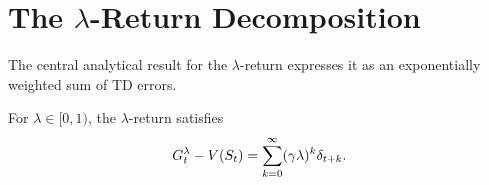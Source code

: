 \documentclass[11pt,a4paper]{article}
\begin{document}
\section{The $\lambda$-Return Decomposition}
\label{sec:lambda_decomp}

The central analytical result for the $\lambda$-return expresses it as
an exponentially weighted sum of TD errors.

\begin{keyresult}[title={$\lambda$-Return Decomposition}]
\begin{theorem}
\label{thm:lambda_decomp}
For $\lambda \in [0,1)$, the $\lambda$-return satisfies
\begin{equation}
  G_t^\lambda - V(S_t) = \sum_{k=0}^{\infty}
  (\gamma\lambda)^k \delta_{t+k}.
  \label{eq:lambda_decomp}
\end{equation}
\end{theorem}
\end{keyresult}
\end{document}
